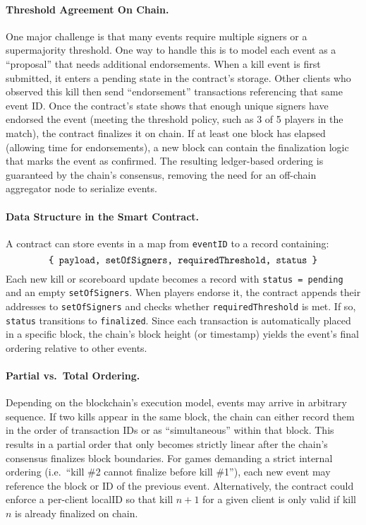 \documentclass[11pt]{article}
\begin{document}
\paragraph{Threshold Agreement On Chain.}
One major challenge is that many events require multiple signers or a supermajority threshold. One way to handle this is to model each event as a “proposal” that needs additional endorsements. When a kill event is first submitted, it enters a pending state in the contract’s storage. Other clients who observed this kill then send “endorsement” transactions referencing that same event ID. Once the contract’s state shows that enough unique signers have endorsed the event (meeting the threshold policy, such as 3 of 5 players in the match), the contract finalizes it on chain. If at least one block has elapsed (allowing time for endorsements), a new block can contain the finalization logic that marks the event as confirmed. The resulting ledger-based ordering is guaranteed by the chain’s consensus, removing the need for an off-chain aggregator node to serialize events.

\paragraph{Data Structure in the Smart Contract.}
A contract can store events in a map from \texttt{eventID} to a record containing:
\[
\text{\tt \{ payload, setOfSigners, requiredThreshold, status \}}
\]
Each new kill or scoreboard update becomes a record with \texttt{status = pending} and an empty \texttt{setOfSigners}. When players endorse it, the contract appends their addresses to \texttt{setOfSigners} and checks whether \texttt{requiredThreshold} is met. If so, \texttt{status} transitions to \texttt{finalized}. Since each transaction is automatically placed in a specific block, the chain’s block height (or timestamp) yields the event’s final ordering relative to other events.

\paragraph{Partial vs.\ Total Ordering\cite{almeida2024}.}
Depending on the blockchain’s execution model, events may arrive in arbitrary sequence. If two kills appear in the same block, the chain can either record them in the order of transaction IDs or as “simultaneous” within that block. This results in a partial order that only becomes strictly linear after the chain’s consensus finalizes block boundaries. For games demanding a strict internal ordering (i.e.\ “kill \#2 cannot finalize before kill \#1”), each new event may reference the block or ID of the previous event. Alternatively, the contract could enforce a per-client localID so that kill $n+1$ for a given client is only valid if kill $n$ is already finalized on chain.
\end{document}

